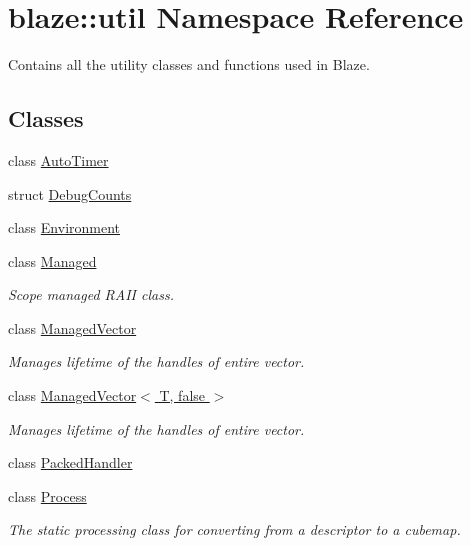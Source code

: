 \hypertarget{namespaceblaze_1_1util}{}\section{blaze\+:\+:util Namespace Reference}
\label{namespaceblaze_1_1util}


Contains all the utility classes and functions used in Blaze.  


\subsection*{Classes}
\begin{DoxyCompactItemize}
\item 
class \hyperlink{classblaze_1_1util_1_1AutoTimer}{Auto\+Timer}
\item 
struct \hyperlink{structblaze_1_1util_1_1DebugCounts}{Debug\+Counts}
\item 
class \hyperlink{classblaze_1_1util_1_1Environment}{Environment}
\item 
class \hyperlink{classblaze_1_1util_1_1Managed}{Managed}
\begin{DoxyCompactList}\small\item\em Scope managed R\+A\+II class. \end{DoxyCompactList}\item 
class \hyperlink{classblaze_1_1util_1_1ManagedVector}{Managed\+Vector}
\begin{DoxyCompactList}\small\item\em Manages lifetime of the handles of entire vector. \end{DoxyCompactList}\item 
class \hyperlink{classblaze_1_1util_1_1ManagedVector_3_01T_00_01false_01_4}{Managed\+Vector$<$ T, false $>$}
\begin{DoxyCompactList}\small\item\em Manages lifetime of the handles of entire vector. \end{DoxyCompactList}\item 
class \hyperlink{classblaze_1_1util_1_1PackedHandler}{Packed\+Handler}
\item 
class \hyperlink{classblaze_1_1util_1_1Process}{Process}
\begin{DoxyCompactList}\small\item\em The static processing class for converting from a descriptor to a cubemap. \end{DoxyCompactList}\item 

\end{DoxyCompactItemize}
